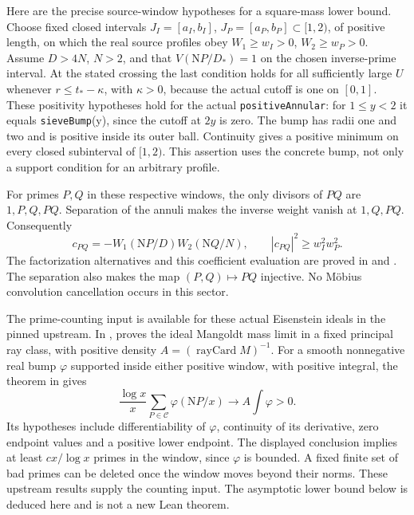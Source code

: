 \documentclass[11pt]{article}
\newcommand{\Nm}{\mathrm N}
\begin{document}
Here are the precise source-window hypotheses for a square-mass
lower bound. Choose fixed closed intervals
\(J_I=[a_I,b_I]\), \(J_P=[a_P,b_P]\subset[1,2)\), of positive length,
on which the real source profiles obey
\(W_1\ge w_I>0\), \(W_2\ge w_P>0\).
Assume \(D>4N\), \(N>2\), and that
\(V(\Nm P/D_*)=1\) on the chosen inverse-prime interval.
At the stated crossing the last condition holds for all sufficiently
large \(U\) whenever \(r\le t_* -\kappa\), with \(\kappa>0\), because
the actual cutoff is one on \([0,1]\).
These positivity hypotheses hold for the actual
\texttt{positiveAnnular}: for \(1\le y<2\) it equals
\texttt{sieveBump}(y), since the cutoff at \(2y\) is zero.
The bump has radii one and two and is positive inside its outer ball.
Continuity gives a positive minimum on every closed subinterval of
\([1,2)\). This assertion uses the concrete bump, not only a support
condition for an arbitrary profile.

For primes \(P,Q\) in these respective windows, the only divisors of
\(PQ\) are \(1,P,Q,PQ\). Separation of the annuli makes the inverse
weight vanish at \(1,Q,PQ\). Consequently
\[
 c_{PQ}=-W_1(\Nm P/D)W_2(\Nm Q/N),\qquad
 |c_{PQ}|^2\ge w_I^2w_P^2.
\]
The factorization alternatives and this coefficient evaluation are
proved in  and
.
The separation also makes the map \((P,Q)\mapsto PQ\) injective.
No M\"obius convolution cancellation occurs in this sector.

The prime-counting input is available for these actual Eisenstein
ideals in the pinned upstream. In
,
 proves the
ideal Mangoldt mass limit in a fixed principal ray class, with
positive density \(A=(\operatorname{rayCard}M)^{-1}\).
For a smooth nonnegative real bump \(\varphi\) supported inside
either positive window, with positive integral, the theorem
in  gives
\[
 \frac{\log x}{x}\sum_{P\in\mathcal C}
       \varphi(\Nm P/x)\longrightarrow A\int\varphi>0.
\]
Its hypotheses include differentiability of \(\varphi\), continuity
of its derivative, zero endpoint values and a positive lower endpoint.
The displayed conclusion implies at least \(c x/\log x\) primes in
the window, since \(\varphi\) is bounded. A fixed finite set of bad
primes can be deleted once the window moves beyond their norms.
These upstream results supply the counting input. The asymptotic
lower bound below is deduced here and is not a new Lean theorem.
\end{document}
